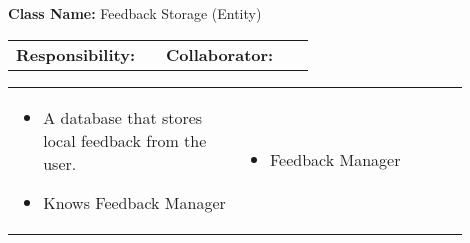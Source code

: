 \begin{red_cards}[]
    \textbf{Class Name:} Feedback Storage (Entity)
    \tcbline
    \begin{tabular}{p{0.45\linewidth} | p{0.45\linewidth}}
        \textbf{Responsibility:}& 
        \textbf{Collaborator:}\\
    \end{tabular}
    \tcbline
    \begin{tabular}{p{0.45\linewidth} | p{0.45\linewidth}}
        \begin{itemize}
            \item A database that stores local feedback from the user.
            \item Knows Feedback Manager
        \end{itemize}
        &
        \begin{itemize}
            \item Feedback Manager
        \end{itemize}
    \end{tabular}
\end{red_cards}